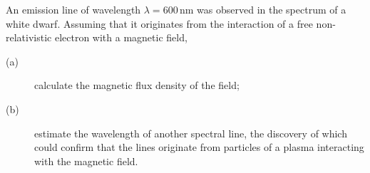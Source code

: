 An emission line of wavelength $\lambda = 600$\,nm was observed in the
spectrum of a white dwarf. Assuming that it originates from the interaction of
a free non-relativistic electron with a magnetic field,

\begin{description}
\item[(a)] calculate the magnetic flux density of the field;
\item[(b)] estimate the wavelength of another spectral line, the discovery of
  which could confirm that the lines originate from particles of a plasma
  interacting with the magnetic field.
\end{description}
